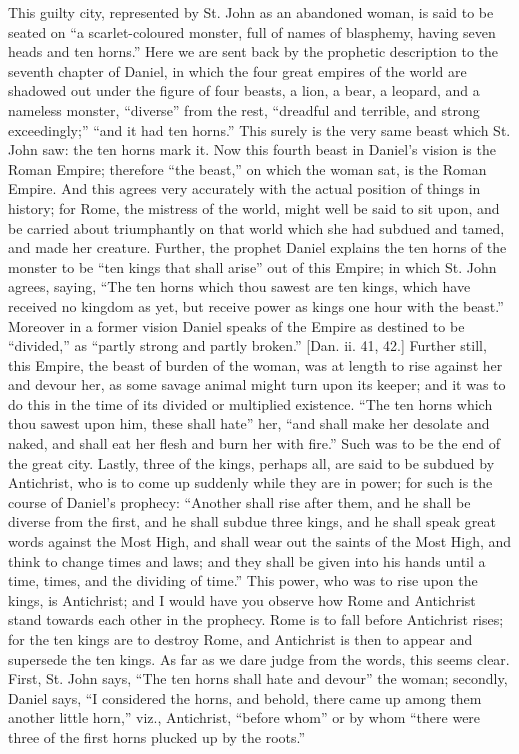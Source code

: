 This guilty city, represented by St. John as an abandoned woman, is
said to be seated on ``a scarlet-coloured monster, full of
names of blasphemy, having seven heads and ten horns.'' Here we
are sent back by the prophetic description to the seventh chapter of
Daniel, in which the four great empires of the world are shadowed out
under the figure of four beasts, a lion, a bear, a leopard, and a
nameless monster, ``diverse'' from the rest, ``dreadful
and terrible, and strong exceedingly;'' ``and it had ten
horns.'' This surely is the very same beast which St. John saw:
the ten horns mark it. Now this fourth beast in Daniel's vision is the
Roman Empire; therefore ``the beast,'' on which the woman sat,
is the Roman Empire. And this agrees very accurately with the actual
position of things in history; for Rome, the mistress of the world,
might well be said to sit upon, and be carried about triumphantly on
that world which she had subdued and tamed, and made her creature.
Further, the prophet Daniel explains the ten horns of the monster to
be ``ten kings that shall arise'' out of this Empire; in which
St. John agrees, saying, ``The ten horns which thou sawest are ten
kings, which have received no kingdom as yet, but receive power as
kings one hour with the beast.'' Moreover in a former vision
Daniel speaks of the Empire as destined to be ``divided,'' as
``partly strong and partly broken.'' [Dan. ii. 41, 42.]
Further still, this Empire, the beast of burden of the woman, was at
length to rise against her and devour her, as some savage animal might
turn upon its keeper; and it was to do this in the time of its divided
or multiplied existence. ``The ten horns which thou sawest upon
him, these shall hate'' her, ``and shall make her desolate and
naked, and shall eat her flesh and burn her with fire.'' Such was
to be the end of the great city. Lastly, three of the kings, perhaps
all, are said to be subdued by Antichrist, who is to come up
suddenly while they are in power; for such is the course of Daniel's
prophecy: ``Another shall rise after them, and he shall be diverse
from the first, and he shall subdue three kings, and he shall speak
great words against the Most High, and shall wear out the saints of
the Most High, and think to change times and laws; and they shall be
given into his hands until a time, times, and the dividing of
time.'' This power, who was to rise upon the kings, is Antichrist;
and I would have you observe how Rome and Antichrist stand towards
each other in the prophecy. Rome is to fall before Antichrist rises;
for the ten kings are to destroy Rome, and Antichrist is then to
appear and supersede the ten kings. As far as we dare judge from the
words, this seems clear. First, St. John says, ``The ten horns
shall hate and devour'' the woman; secondly, Daniel says, ``I
considered the horns, and behold, there came up among them another
little horn,'' viz., Antichrist, ``before whom'' or by
whom ``there were three of the first horns plucked up by the
roots.''

